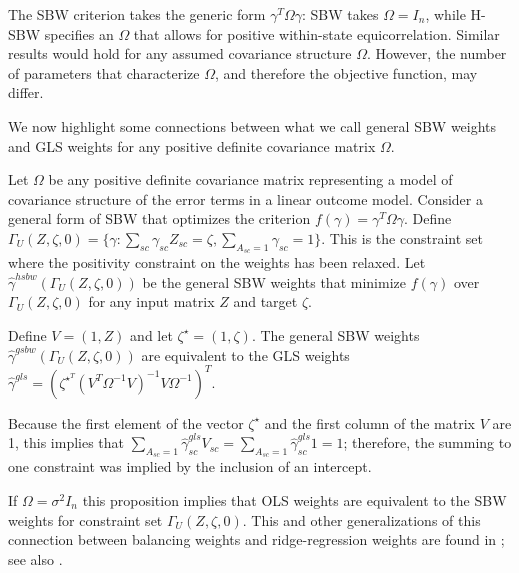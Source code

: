 \begin{remark}
    The SBW criterion takes the generic form $\gamma^T\Omega\gamma$: SBW takes $\Omega = I_n$, while H-SBW specifies an $\Omega$ that allows for positive within-state equicorrelation. Similar results would hold for any assumed covariance structure $\Omega$. However, the number of parameters that characterize $\Omega$, and therefore the objective function, may differ.
\end{remark}

We now highlight some connections between what we call general SBW weights and GLS weights for any positive definite covariance matrix $\Omega$.

\begin{proposition}\label{cl5}
    Let $\Omega$ be any positive definite covariance matrix representing a model of covariance structure of the error terms in a linear outcome model. Consider a general form of SBW that optimizes the criterion $f(\gamma) = \gamma^T\Omega\gamma$. Define $\Gamma_U(Z, \zeta, 0) = \{\gamma: \sum_{sc}\gamma_{sc}Z_{sc} = \zeta, \sum_{A_{sc} = 1}\gamma_{sc} = 1\}$. This is the constraint set where the positivity constraint on the weights has been relaxed. Let $\hat{\gamma}^{hsbw}(\Gamma_U(Z, \zeta, 0))$ be the general SBW weights that minimize $f(\gamma)$ over $\Gamma_U(Z, \zeta, 0)$ for any input matrix $Z$ and target $\zeta$.
    
    Define $V = (1, Z)$ and let $\zeta^\star = (1, \zeta)$. The general SBW weights $\hat{\gamma}^{gsbw}(\Gamma_U(Z, \zeta, 0))$ are equivalent to the GLS weights $\hat{\gamma}^{gls} = (\zeta^\star^T(V^T\Omega^{-1}V)^{-1}V\Omega^{-1})^T$. 
\end{proposition}


\begin{remark}
    Because the first element of the vector $\zeta^\star$ and the first column of the matrix $V$ are 1, this implies that $\sum_{A_{sc} = 1}\hat{\gamma}_{sc}^{gls}V_{sc} = \sum_{A_{sc} = 1}\hat{\gamma}^{gls}_{sc}1 = 1$; therefore, the summing to one constraint was implied by the inclusion of an intercept.
\end{remark}

\begin{remark}
    If $\Omega = \sigma^2I_n$ this proposition implies that OLS weights are equivalent to the SBW weights for constraint set $\Gamma_U(Z, \zeta, 0)$. This and other generalizations of this connection between balancing weights and ridge-regression weights are found in \cite{ben2021augmented}; see also \cite{chattopadhyay2021implied}.
\end{remark}

